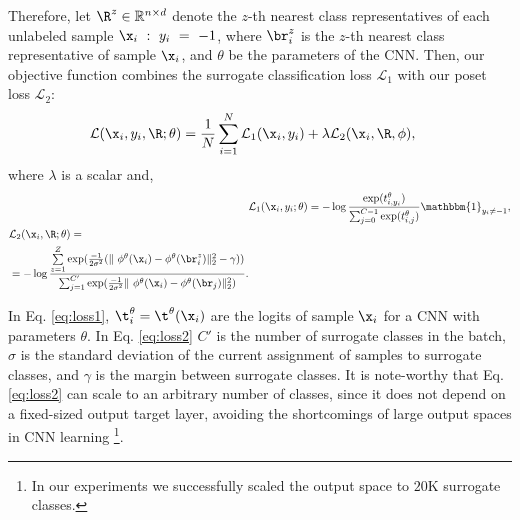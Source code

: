 \documentclass[10pt,twocolumn,letterpaper]{article}
\begin{document}
Therefore, let $\R^z \in \mathbb{R}^{n \times d}$ denote the $z$-th nearest class representatives of each unlabeled sample $\x_i~:~y_i~=~-1$, where $\br^z_i$ is the $z$-th nearest class representative of sample $\x_i$, and $\theta$ be the parameters of the CNN. Then, our objective function combines the surrogate classification loss $\mathcal{L}_1$ with our poset loss $\mathcal{L}_2$:
\begin{alignat}{2}
&\mathcal{L}(\x_i, y_i, \R; \theta) = \frac{1}{N} \sum_{i=1}^{N} \mathcal{L}_1(\x_i, y_i) + \lambda\mathcal{L}_2(\x_i, \R, \phi) \label{eq:loss},
\end{alignat}
where $\lambda$ is a scalar and,
\begin{alignat}{2}
&\mathcal{L}_1(\x_i,y_i; \theta)=-\log\frac{\exp(t^{\theta}_{i,y_i})}{\sum_{j=0}^{C-1}\exp(t^{\theta}_{i,j})} \mathbbm{1}_{y_i\neq-1}, \label{eq:loss1}\\
\begin{split}
&\mathcal{L}_2(\x_i,\R; \theta)=\\
&=-\log\frac{\sum\limits_{z=1}^{Z}\exp({\frac{-1}{2\sigma^2} ( \|\ \phi^\theta(\x_i) - \phi^\theta(\br^z_i) \|_2^2-\gamma}))} {\sum_{j=1}^{C'}\exp(\frac{-1}{2\sigma^2}\|\ \phi^\theta(\x_i) - \phi^\theta(\br_j) \|_2^2)}. \label{eq:loss2}
\end{split}
\end{alignat}

In Eq. \eqref{eq:loss1}, $\t^\theta_i = \t^\theta(\x_i)$ are the logits of sample $\x_i$ for a CNN with parameters $\theta$. In Eq. \eqref{eq:loss2} $C'$ is the number of surrogate classes in the batch, $\sigma$ is the standard deviation of the current assignment of samples to surrogate classes, and $\gamma$ is the margin between surrogate classes. It is note-worthy that Eq. \eqref{eq:loss2} can scale to an arbitrary number of classes, since it does not depend on a fixed-sized output target layer, avoiding the shortcomings of large output spaces in CNN learning \cite{outputspace} \footnote{In our experiments we successfully scaled the output space to $20$K surrogate classes.}.
\end{document}
